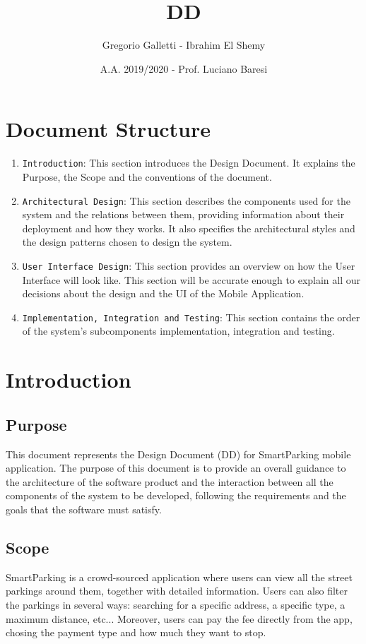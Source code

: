 \documentclass[11pt]{article} %
\title{DD}
\author{Gregorio Galletti - Ibrahim El Shemy}
\date{A.A. 2019/2020 - Prof. Luciano Baresi} %
\begin{document}
\maketitle
\tableofcontents
\newpage

\section{Document Structure}
\begin{enumerate}

\item \texttt{Introduction}: This section introduces the Design Document. It explains the Purpose, the Scope and the conventions of the document.
\item \texttt{Architectural Design}: This section describes the components used for the system and the relations between them, providing information about their deployment and how they works. It also specifies the architectural styles and the design patterns chosen to design the system.
\item \texttt{User Interface Design}: This section provides an overview on how the User Interface will look like. This section will be accurate enough to explain all our decisions about the design and the UI of the Mobile Application. 
\item \texttt{Implementation, Integration and Testing}: This section contains the order of the system's subcomponents implementation, integration and testing.

\end{enumerate}

\section{Introduction}

\subsection{Purpose}
This document represents the Design Document (DD) for SmartParking mobile application. The purpose of this document is to provide an overall guidance to the architecture of the software product and the interaction between all the components of the system to be developed, following the requirements and the goals that the software must satisfy.

\subsection{Scope}
SmartParking is a crowd-sourced application where users can view all the street parkings around them, together with detailed information. Users can also filter the parkings in several ways: searching for a specific address, a specific type, a maximum distance, etc... Moreover, users can pay the fee directly from the app, chosing the payment type and how much they want to stop.
\end{document}
